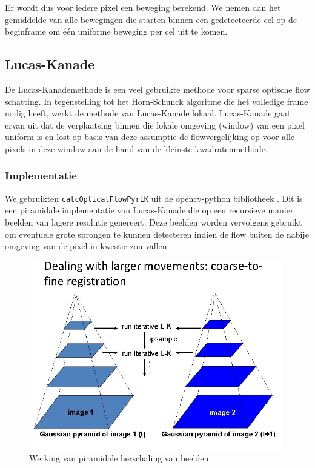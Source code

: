 \documentclass{article}
\begin{document}
\begin{multicols}{2}
\noindent Er wordt dus voor iedere pixel een beweging berekend. We nemen dan het gemiddelde van alle bewegingen die starten binnen een gedetecteerde cel op de beginframe om één uniforme beweging per cel uit te komen.

\subsection{Lucas-Kanade}
De Lucas-Kanademethode \cite{ref_LK} is een veel gebruikte methode voor sparse optische flow schatting. In tegenstelling tot het Horn-Schunck algoritme die het volledige frame nodig heeft, werkt de methode van Lucas-Kanade lokaal. Lucas-Kanade gaat ervan uit dat de verplaatsing binnen die lokale omgeving (window) van een pixel uniform is en lost op basis van deze assumptie de flowvergelijking op voor alle pixels in deze window aan de hand van de kleinste-kwadratenmethode.

\subsubsection{Implementatie}
We gebruikten \verb|calcOpticalFlowPyrLK| uit de opencv-python bibliotheek \cite{ref_opencv_LK}. Dit is een piramidale implementatie \cite{ref_pyr_LK} van Lucas-Kanade die op een recursieve manier beelden van lagere resolutie genereert. Deze beelden worden vervolgens gebruikt om eventuele grote sprongen te kunnen detecteren indien de flow buiten de nabije omgeving van de pixel in kwestie zou vallen.

\begin{figure}[H]
\centering
\includegraphics[width=0.98\textwidth]{images/pyr_LK.jpg}
\caption{\label{fig:pyr_LK}Werking van piramidale herschaling van beelden}
\end{figure}


\end{multicols}
\end{document}
